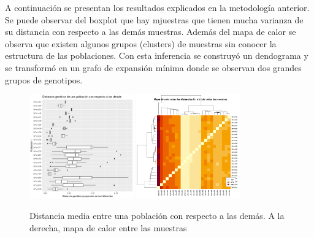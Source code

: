 \documentclass{article}
\begin{document}
A continuación se presentan los resultados explicados en la metodología anterior. 
Se puede observar del boxplot que hay mjuestras que tienen mucha varianza de su distancia con respecto a las demás muestras. Además del mapa de calor se observa que existen algunos grupos (clusters) de muestras sin conocer la estructura de las poblaciones. Con esta inferencia se construyó un dendograma y se transformó en un grafo de expansión mínima donde se observan dos grandes grupos de genotipos. 
\begin{figure}[h]
    \centering
    \includegraphics[width=0.4\textwidth]{boxplot_distancia.png}
    \includegraphics[width=0.4\textwidth]{heatmap_distance.png}
    \caption{Distancia media entre una población con respecto a las demás. A la derecha, mapa de calor entre las muestras}
    \label{fig:heatmap}
\end{figure}
\end{document}
